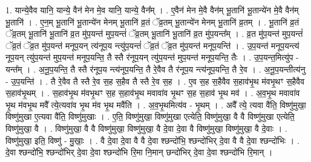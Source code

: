 \documentclass[17pt]{extarticle}
\begin{document}
1. यान्ये॒वैव यानि॒ यान्ये॒ वैन॑ मेन मे॒व यानि॒ यान्ये॒ वैन᳚म् । . ए॒वैन॑ मेन मे॒वै वैन॑म् भू॒तानि॑ भू॒तान्ये॑न मे॒वै वैन॑म् भू॒तानि॑ । . ए॒न॒म् भू॒तानि॑ भू॒तान्ये॑न मेनम् भू॒तानि॑ व्र॒तं ॅव्र॒तम् भू॒तान्ये॑न मेनम् भू॒तानि॑ व्र॒तम् । . भू॒तानि॑ व्र॒तं ॅव्र॒तम् भू॒तानि॑ भू॒तानि॑ व्र॒त मु॑प॒यन्त॑ मुप॒यन्तं॑ ॅव्र॒तम् भू॒तानि॑ भू॒तानि॑ व्र॒त मु॑प॒यन्त᳚म् । . व्र॒त मु॑प॒यन्त॑ मुप॒यन्तं॑ ॅव्र॒तं ॅव्र॒त मु॑प॒यन्त॑ मनूप॒यन् त्य॑नूप॒य न्त्यु॑प॒यन्तं॑ ॅव्र॒तं ॅव्र॒त मु॑प॒यन्त॑ मनूप॒यन्ति॑ । . उ॒प॒यन्त॑ मनूप॒यन्त्य॑ नूप॒यन् त्यु॑प॒यन्त॑ मुप॒यन्त॑ मनूप॒यन्ति॒ तै स्तै र॑नूप॒यन् त्यु॑प॒यन्त॑ मुप॒यन्त॑ मनूप॒यन्ति॒ तैः । . उ॒प॒यन्त॒मित्यु॑प - यन्त᳚म् । . अ॒नू॒प॒यन्ति॒ तै स्तै र॑नूप॒य न्त्य॑नूप॒यन्ति॒ तै रे॒वैव तै र॑नूप॒य न्त्य॑नूप॒यन्ति॒ तै रे॒व । . अ॒नू॒प॒यन्तीत्य॑नु - उ॒प॒यन्ति॑ । . तै रे॒वैव तै स्तै रे॒व स॒ह स॒हैव तै स्तै रे॒व स॒ह । . ए॒व स॒ह स॒हैवैव स॒हाव॑भृ॒थ म॑वभृ॒थꣳ स॒हैवैव स॒हाव॑भृ॒थम् । . स॒हाव॑भृ॒थ म॑वभृ॒थꣳ स॒ह स॒हाव॑भृ॒थ मवावा॑व भृ॒थꣳ स॒ह स॒हाव॑ भृ॒थ मव॑ । . अ॒व॒भृ॒थ मवावा॑व भृ॒थ म॑वभृ॒थ मवै᳚ त्ये॒त्यवा॑व भृ॒थ म॑व भृ॒थ मवै॑ति । . अ॒व॒भृ॒थमित्य॑व - भृ॒थम् । . अवै᳚ त्ये॒ त्यवा वै॑ति॒ विष्णु॑मुखा॒ विष्णु॑मुखा ए॒त्यवा वै॑ति॒ विष्णु॑मुखाः । . ए॒ति॒ विष्णु॑मुखा॒ विष्णु॑मुखा एत्येति॒ विष्णु॑मुखा॒ वै वै विष्णु॑मुखा एत्येति॒ विष्णु॑मुखा॒ वै । . विष्णु॑मुखा॒ वै वै विष्णु॑मुखा॒ विष्णु॑मुखा॒ वै दे॒वा दे॒वा वै विष्णु॑मुखा॒ विष्णु॑मुखा॒ वै दे॒वाः । . विष्णु॑मुखा॒ इति॒ विष्णु॑ - मु॒खाः॒ । . वै दे॒वा दे॒वा वै वै दे॒वा श्छन्दो॑भि॒ श्छन्दो॑भिर् दे॒वा वै वै दे॒वा श्छन्दो॑भिः । . दे॒वा श्छन्दो॑भि॒ श्छन्दो॑भिर् दे॒वा दे॒वा श्छन्दो॑भि रि॒मा नि॒मान् छन्दो॑भिर् दे॒वा दे॒वा श्छन्दो॑भि रि॒मान् । \newline
\end{document}
